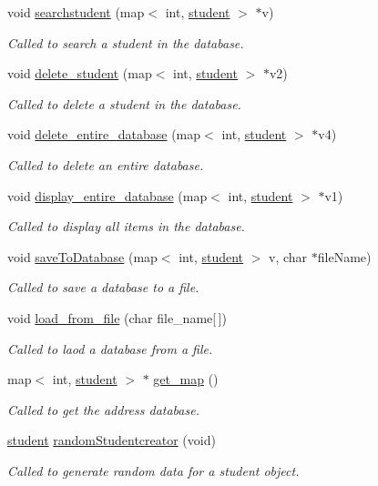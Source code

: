 \begin{DoxyCompactItemize}
void \hyperlink{classcollege_aac9c72f720e586ebd1d1f615af6ef99b}{searchstudent} (map$<$ int, \hyperlink{classstudent}{student} $>$ $\ast$v)
\begin{DoxyCompactList}\small\item\em Called to search a student in the database. \end{DoxyCompactList}\item 
void \hyperlink{classcollege_a632da2a0b2cb6a0b9771ea3b257fc372}{delete\-\_\-student} (map$<$ int, \hyperlink{classstudent}{student} $>$ $\ast$v2)
\begin{DoxyCompactList}\small\item\em Called to delete a student in the database. \end{DoxyCompactList}\item 
void \hyperlink{classcollege_afcf88dcd01476507225badd87a93093a}{delete\-\_\-entire\-\_\-database} (map$<$ int, \hyperlink{classstudent}{student} $>$ $\ast$v4)
\begin{DoxyCompactList}\small\item\em Called to delete an entire database. \end{DoxyCompactList}\item 
void \hyperlink{classcollege_a3f706e023efe287c55977e46b871f292}{display\-\_\-entire\-\_\-database} (map$<$ int, \hyperlink{classstudent}{student} $>$ $\ast$v1)
\begin{DoxyCompactList}\small\item\em Called to display all items in the database. \end{DoxyCompactList}\item 
void \hyperlink{classcollege_a295ee14be28afece0960ad05fdfc32c3}{save\-To\-Database} (map$<$ int, \hyperlink{classstudent}{student} $>$ v, char $\ast$file\-Name)
\begin{DoxyCompactList}\small\item\em Called to save a database to a file. \end{DoxyCompactList}\item 
void \hyperlink{classcollege_ab8a4110db123830691855ebf16e317d1}{load\-\_\-from\-\_\-file} (char file\-\_\-name\mbox{[}$\,$\mbox{]})
\begin{DoxyCompactList}\small\item\em Called to laod a database from a file. \end{DoxyCompactList}\item 
map$<$ int, \hyperlink{classstudent}{student} $>$ $\ast$ \hyperlink{classcollege_aac75ca58604733962040937122ebbe0b}{get\-\_\-map} ()
\begin{DoxyCompactList}\small\item\em Called to get the address database. \end{DoxyCompactList}\item 
\hyperlink{classstudent}{student} \hyperlink{classcollege_ac77564cda101bd33abddd3322252d35f}{random\-Studentcreator} (void)
\begin{DoxyCompactList}\small\item\em Called to generate random data for a student object. \end{DoxyCompactList}\end{DoxyCompactItemize}


